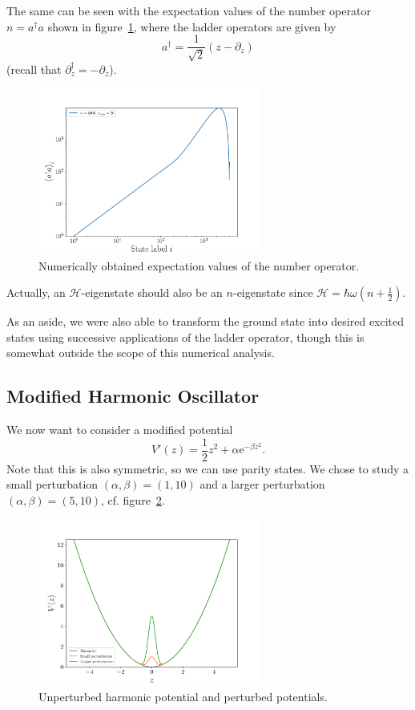 \documentclass[a4paper,DIV=12,english]{scrartcl}
\begin{document}
The same can be seen with the expectation values of the number operator $n=a^\dag a$ shown in figure~\ref{fig:occupation}, where the ladder operators are given by
\begin{equation}
    a^\dag = \frac{1}{\sqrt{2}}\left(z - \partial_z\right)
\end{equation}
(recall that $\partial_z^\dag = -\partial_z$).
\begin{figure}
    \centering
    \includegraphics[width=0.65\textwidth]{../plots/occupation.pdf}
    \caption{Numerically obtained expectation values of the number operator.}
    \label{fig:occupation}
\end{figure}
Actually, an $\mathcal{H}$-eigenstate should also be an $n$-eigenstate since $\mathcal{H} = \hbar\omega\left(n + \frac{1}{2}\right)$.

As an aside, we were also able to transform the ground state into desired excited states using successive applications of the ladder operator, though this is somewhat outside the scope of this numerical analysis.

\FloatBarrier
\subsection{Modified Harmonic Oscillator}
We now want to consider a modified potential
\begin{equation}
    V'(z) = \frac{1}{2}z^2 + \alpha \text{e}^{-\beta z^2}.
\end{equation}
Note that this is also symmetric, so we can use parity states. We chose to study a small perturbation $(\alpha,\beta) = (1, 10)$ and a larger perturbation $(\alpha,\beta) = (5, 10)$, cf. figure~\ref{fig:pot}.
\begin{figure}
    \centering
    \includegraphics[width=0.65\textwidth]{../plots/pot.pdf}
    \caption{Unperturbed harmonic potential and perturbed potentials.}
    \label{fig:pot}
\end{figure}
\end{document}
